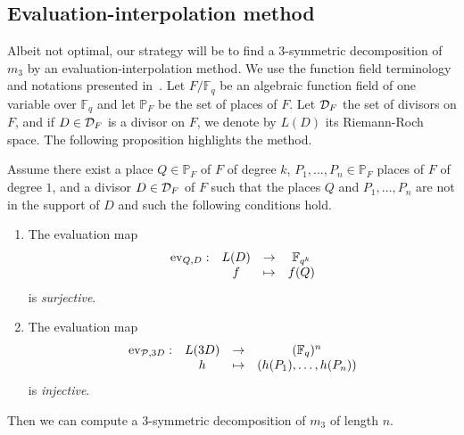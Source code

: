 \documentclass[a4paper,11pt]{article}
\begin{document}
\subsection{Evaluation-interpolation method}
\label{sec:eval}

Albeit not optimal, our strategy will be to find a $3$-symmetric decomposition of
$m_3$ by an evaluation-interpolation method. We use the function field
terminology and notations
presented in~\cite{Stichtenoth09}. Let $F/\mathbb{F}_q$ be an algebraic
function field of one variable over $\mathbb{F}_{q}$ and let $\mathbb{P}_F$ be the
set of places of $F$. Let $\mathcal{D}_F$ the set of
divisors on $F$, and if $D\in\mathcal{D}_F$ is a divisor on
$F$, we denote by $L(D)$ its Riemann-Roch space. The following proposition
highlights the method.

\begin{prop}
  \label{prop:method}
  Assume there exist a place $Q\in\mathbb{P}_{F}$ of $F$ of degree $k$, $P_1,
  \dots, P_n\in\mathbb{P}_F$ places of $F$ of degree $1$, and a divisor
  $D\in\mathcal{D}_F$ of $F$ such that the places $Q$ and $P_1, \dots, P_n$ are not in
  the support of $D$ and such the following conditions hold.
  \begin{enumerate}
    \item \label{cond:1} The evaluation map
      \[
        \begin{array}{cccc}
        \operatorname{ev}_{Q, D}: & L(D) & \to & \mathbb{F}_{q^k}\\
  & f & \mapsto & f(Q)
\end{array}
\]
is \emph{surjective}.
    \item \label{cond:2} The evaluation map
      \[
        \begin{array}{cccc}
        \operatorname{ev}_{\mathcal{P}, 3D}: & L(3D) & \to & (\mathbb{F}_{q})^n\\
  & h & \mapsto & (h(P_1), \dots, h(P_n))
\end{array}
\]
is \emph{injective}.
  \end{enumerate}
  Then we can compute a $3$-symmetric decomposition of $m_3$ of length $n$.
\end{prop}
\end{document}
